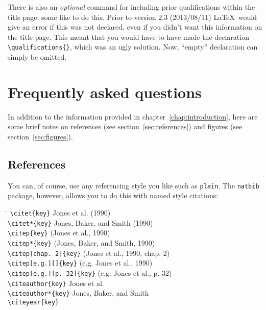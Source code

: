 There is also an \emph{optional} command for including prior
qualifications within the title page; some like to do this. Prior to
version 2.3 (2013/08/11) \LaTeX\ would give an error if this was not
declared, even if you didn't want this information on the title
page. This meant that you would have to have made the declaration
\verb+\qualifications{}+, which was an ugly solution. Now, ``empty''
declaration can simply be omitted.

\chapter{Frequently asked questions\label{chap:faq}}

In addition to the information provided in
chapter~\ref{chap:introduction}, here are some brief notes on
references (see section~\ref{sec:references}) and figures (see
section~\ref{sec:figures}).

\section{References\label{sec:references}}

You can, of course, use any referencing style you like such as
\verb+plain+.  The \verb+natbib+ package, however, allows you to do
this with named style citations:

\begin{tabbing}
\hspace{3in} \= \kill
\verb-\citet{key}- \> Jones et al. (1990) \\
\verb-\citet*{key}- \> Jones, Baker, and Smith (1990) \\
\verb-\citep{key}- \> (Jones et al., 1990) \\
\verb-\citep*{key}- \> (Jones, Baker, and Smith, 1990) \\
\verb-\citep[chap. 2]{key}- \> (Jones et al., 1990, chap. 2) \\
\verb-\citep[e.g.][]{key}- \> (e.g. Jones et al., 1990) \\
\verb-\citep[e.g.][p. 32]{key}- \> (e.g. Jones et al., p. 32) \\
\verb-\citeauthor{key}- \> Jones et al. \\
\verb-\citeauthor*{key}- \> Jones, Baker, and Smith \\
\verb-\citeyear{key}-  \\
\end{tabbing}

